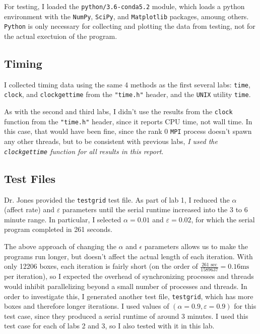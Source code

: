 \documentclass{article}
\begin{document}
For testing, I loaded the \texttt{python/3.6-conda5.2} module, which loads a
python environment with the \texttt{NumPy}, \texttt{SciPy}, and
\texttt{Matplotlib} packages, amoung others. \texttt{Python} is only necessary
for collecting and plotting the data from testing, not for the actual exectuion
of the program.

\subsection*{Timing}
\label{subsec:timing}

I collected timing data using the same 4 methods as the first several labs:
\texttt{time}, \texttt{clock}, and \texttt{clock\textunderscore gettime} from
the \texttt{"time.h"} header, and the \texttt{UNIX} utility \texttt{time}.

As with the second and third labs, I didn't use the results from the \texttt{clock}
function from the \texttt{"time.h"} header, since it reports CPU time, not wall
time. In this case, that would have been fine, since the rank 0 \texttt{MPI} process
doesn't spawn any other threads, but to be consistent with previous labs,
\emph{I used the \texttt{clock\textunderscore gettime}
function for all results in this report}.

\subsection*{Test Files}
\label{subsec:test_files}

Dr. Jones provided the \texttt{testgrid} test file.  As part of lab 1, I reduced the $\alpha$ (affect rate) and
$\varepsilon$ parameters until the serial runtime increased into the 3 to 6
minute range. In particular, I selected $\alpha = 0.01$ and $\varepsilon =
0.02$, for which the serial program completed in 261 seconds.

The above approach of changing the $\alpha$ and $\epsilon$ parameters allows us
to make the programs run longer, but doesn't affect the actual length of each
iteration. With only 12206 boxes, each iteration is fairly short (on the order
of $\frac{261\textrm{ sec}}{1589637} = 0.16\textrm{ms}$ per iteration), so I
expected the overhead of synchronizing processes and threads would inhibit parallelizing
beyond a small number of processes and threads. In order to investigate this, I generated
another test file, \texttt{testgrid},
which has more boxes and therefore longer iterations. I used values of
$(\alpha=0.9, \varepsilon=0.9)$ for this test case, since they produced a
serial runtime of around 3 minutes. I used this test case for each of labs 2 and 3,
so I also tested with it in this lab.
\end{document}
